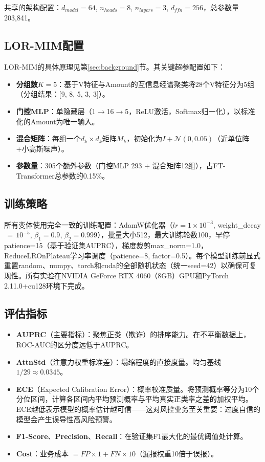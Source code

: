 共享的架构配置：$d_{model}=64$, $n_{heads}=8$, $n_{layers}=3$, $d_{ffn}=256$，总参数量203,841。

\subsection{LOR-MIM配置}

LOR-MIM的具体原理见第\ref{sec:background}节。其关键超参配置如下：
\begin{itemize}
    \item \textbf{分组数$K=5$}：基于V特征与Amount的互信息经谱聚类将28个V特征分为5组（分组结果：[9, 8, 5, 3, 3]）。
    \item \textbf{门控MLP}：单隐藏层（1$\to$16$\to$5，ReLU激活，Softmax归一化），以标准化的Amount为唯一输入。
    \item \textbf{混合矩阵}：每组一个$d_k \times d_k$矩阵$M_k$，初始化为$I + \mathcal{N}(0, 0.05)$（近单位阵+小高斯噪声）。
    \item \textbf{参数量}：305个额外参数（门控MLP 293 + 混合矩阵12组），占FT-Transformer总参数的0.15\%。
\end{itemize}

\subsection{训练策略}

所有变体使用完全一致的训练配置：AdamW优化器（$lr{=}1{\times}10^{-3}$, weight\_decay$\,{=}\,10^{-5}$, $\beta_1{=}0.9$, $\beta_2{=}0.999$），批量大小512，最大训练轮数100，早停patience=15（基于验证集AUPRC），梯度裁剪max\_norm=1.0，ReduceLROnPlateau学习率调度（patience=8, factor=0.5）。每个模型训练前显式重置random、numpy、torch和cuda的全部随机状态（统一seed=42）以确保可复现性。所有实验在NVIDIA GeForce RTX 4060（8GB）GPU和PyTorch 2.11.0+cu128环境下完成。

\subsection{评估指标}

\begin{itemize}
    \item \textbf{AUPRC}（主要指标）：聚焦正类（欺诈）的排序能力。在不平衡数据上，ROC-AUC的区分度远低于AUPRC\cite{saito2015precision}。
    \item \textbf{AttnStd}（注意力权重标准差）：塌缩程度的直接度量。均匀基线$1/29\approx 0.0345$。
    \item \textbf{ECE}（Expected Calibration Error）：概率校准质量。将预测概率等分为10个分位区间，计算各区间内平均预测概率与平均真实正类率之差的加权平均。ECE越低表示模型的概率估计越可信——这对风控业务至关重要：过度自信的模型会产生误导性高风险预警。
    \item \textbf{F1-Score}、\textbf{Precision}、\textbf{Recall}：在验证集F1最大化的最优阈值处计算。
    \item \textbf{Cost}：业务成本 $= FP \times 1 + FN \times 10$（漏报权重10倍于误报）。
\end{itemize}
